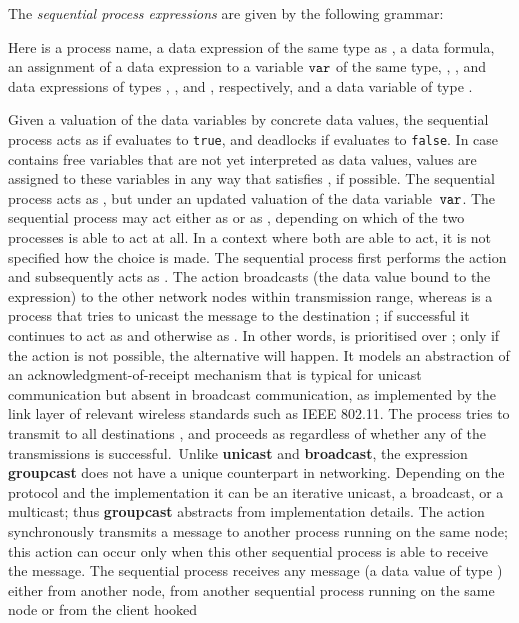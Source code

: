 \documentclass[envcountsame,envcountsect,orivec,runningheads]{llncs}
\renewcommand{\keyw}[1]{\ensuremath{{\tt #1}}}
\begin{document}
The \emph{sequential process expressions} are given by the following grammar:

Here  is a process name,  a data expression of the
same type as ,  a data formula,
 an assignment of a data expression
 to a variable \keyw{var} of the same type, ,
,  and  data expressions of types
{\tIP}, , {\tDATA} and {\tMSG}, respectively, and  a
data variable of type \tMSG.

Given a valuation of the data variables by concrete data values, the
sequential process  acts as  if 
evaluates to {\tt true}, and deadlocks if  evaluates to
{\tt false}. In case  contains free variables that are not
yet interpreted as data values, values are assigned to these variables
in any way that satisfies , if possible.
The sequential process 
acts as , but under an updated valuation of the data variable~\keyw{var}.
The sequential process  may act either as  or as
, depending on which of the two processes is able to act at all.  In a
context where both are able to act, it is not specified how the choice
is made. The sequential process  first performs the action
 and subsequently acts as .  The action
 broadcasts (the data value bound to the
expression)  to the other network nodes within transmission range,
whereas  is a process
that tries to unicast the message  to the destination
; if successful it continues to act as  and otherwise
as . 
In other words,
 is prioritised over ;
only if the action  is not possible,
the alternative  will happen.
It models an abstraction of an acknowledgment-of-receipt mechanism
that is typical for unicast communication but absent in broadcast communication, as implemented by the link
layer of relevant wireless standards such as IEEE 802.11.
The process  tries
to transmit  to all destinations , and proceeds
as  regardless of whether any of the transmissions is successful.\
Unlike {\bf unicast} and  {\bf broadcast}, the expression {\bf groupcast} 
does not have a unique counterpart in networking.
Depending on the protocol and the implementation it can 
be an iterative unicast, a broadcast, or a multicast;
thus  {\bf groupcast} abstracts from implementation details.
The action  synchronously transmits a message to another
process running on the same node; this action can occur only when this
other sequential process is able to receive the message.  The
sequential process  receives any message  (a
data value of type \tMSG) either from another node, from another
sequential process running on the same node or from the client hooked
\end{document}
